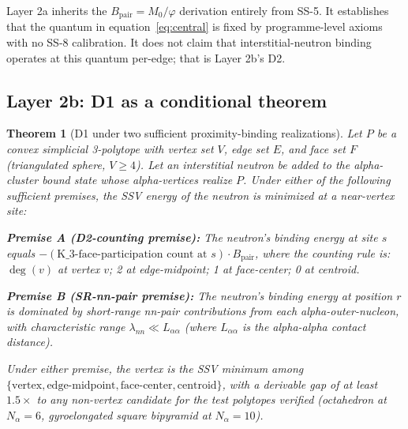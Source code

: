 \documentclass[11pt,letterpaper]{article}
\newtheorem{theorem}{Theorem}[section]
\theoremstyle{definition}
\newcommand{\Mzero}{M_0}
\newcommand{\phig}{\varphi}
\newcommand{\Bpair}{B_{\text{pair}}}
\newcommand{\Nalpha}{N_\alpha}
\newcommand{\Kthree}{K_3}
\newcommand{\degv}{\deg(v)}
\begin{document}
Layer 2a inherits the $\Bpair = \Mzero/\phig$ derivation entirely from SS-5. It establishes that the quantum in equation~\eqref{eq:central} is fixed by programme-level axioms with no SS-8 calibration. It does not claim that interstitial-neutron binding operates at this quantum per-edge; that is Layer 2b's D2.

\subsection{Layer 2b: D1 as a conditional theorem}
\label{sec:theorem3}

\begin{theorem}[D1 under two sufficient proximity-binding realizations]
\label{thm:d1-cond}
Let $P$ be a convex simplicial 3-polytope with vertex set $V$, edge set $E$, and face set $F$ (triangulated sphere, $V \geq 4$). Let an interstitial neutron be added to the alpha-cluster bound state whose alpha-vertices realize $P$. Under either of the following sufficient premises, the SSV energy of the neutron is minimized at a near-vertex site:

\textbf{Premise A (D2-counting premise):} The neutron's binding energy at site $s$ equals $-(\text{\Kthree-face-participation count at } s) \cdot \Bpair$, where the counting rule is: $\degv$ at vertex $v$; 2 at edge-midpoint; 1 at face-center; 0 at centroid.

\textbf{Premise B (SR-nn-pair premise):} The neutron's binding energy at position $r$ is dominated by short-range nn-pair contributions from each alpha-outer-nucleon, with characteristic range $\lambda_{nn} \ll L_{\alpha\alpha}$ (where $L_{\alpha\alpha}$ is the alpha-alpha contact distance).

Under either premise, the vertex is the SSV minimum among $\{\text{vertex}, \text{edge-midpoint}, \text{face-center}, \text{centroid}\}$, with a derivable gap of at least $1.5\times$ to any non-vertex candidate for the test polytopes verified (octahedron at $\Nalpha = 6$, gyroelongated square bipyramid at $\Nalpha = 10$).
\end{theorem}
\end{document}
